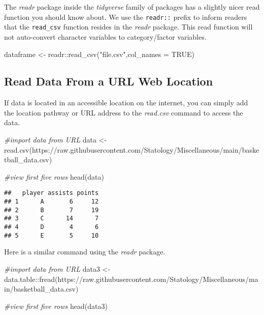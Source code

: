 \documentclass[
]{book}
\newenvironment{Shaded}{\begin{snugshade}}{\end{snugshade}}
\newcommand{\AttributeTok}[1]{\textcolor[rgb]{0.77,0.63,0.00}{#1}}
\newcommand{\CommentTok}[1]{\textcolor[rgb]{0.56,0.35,0.01}{\textit{#1}}}
\newcommand{\ConstantTok}[1]{\textcolor[rgb]{0.00,0.00,0.00}{#1}}
\newcommand{\FunctionTok}[1]{\textcolor[rgb]{0.00,0.00,0.00}{#1}}
\newcommand{\NormalTok}[1]{#1}
\newcommand{\OtherTok}[1]{\textcolor[rgb]{0.56,0.35,0.01}{#1}}
\newcommand{\SpecialCharTok}[1]{\textcolor[rgb]{0.00,0.00,0.00}{#1}}
\newcommand{\StringTok}[1]{\textcolor[rgb]{0.31,0.60,0.02}{#1}}
\begin{document}
The \emph{readr} package inside the \emph{tidyverse} family of packages has a slightly nicer read function you should know about. We use the \texttt{readr::} prefix to inform readers that the \texttt{read\_csv} function resides in the \emph{readr} package. This read function will not auto-convert character variables to category/factor variables.

\begin{Shaded}
\begin{Highlighting}[]
\NormalTok{dataframe }\OtherTok{\textless{}{-}}\NormalTok{ readr}\SpecialCharTok{::}\FunctionTok{read\_csv}\NormalTok{(}\StringTok{"file.csv"}\NormalTok{,}\AttributeTok{col\_names =} \ConstantTok{TRUE}\NormalTok{)}
\end{Highlighting}
\end{Shaded}

\hypertarget{read-data-from-a-url-web-location}{%
\subsection{Read Data From a URL Web Location}\label{read-data-from-a-url-web-location}}

If data is located in an accessible location on the internet, you can simply add the location pathway or URL address to the \emph{read.csv} command to access the data.

\begin{Shaded}
\begin{Highlighting}[]
\CommentTok{\#import data from URL}
\NormalTok{data }\OtherTok{\textless{}{-}} \FunctionTok{read.csv}\NormalTok{(}\StringTok{\textquotesingle{}https://raw.githubusercontent.com/Statology/Miscellaneous/main/basketball\_data.csv\textquotesingle{}}\NormalTok{)}

\CommentTok{\#view first five rows}
\FunctionTok{head}\NormalTok{(data)}
\end{Highlighting}
\end{Shaded}

\begin{verbatim}
##   player assists points
## 1      A       6     12
## 2      B       7     19
## 3      C      14      7
## 4      D       4      6
## 5      E       5     10
\end{verbatim}

Here is a similar command using the \emph{readr} package.

\begin{Shaded}
\begin{Highlighting}[]
\CommentTok{\#import data from URL}
\NormalTok{data3 }\OtherTok{\textless{}{-}}\NormalTok{ data.table}\SpecialCharTok{::}\FunctionTok{fread}\NormalTok{(}\StringTok{\textquotesingle{}https://raw.githubusercontent.com/Statology/Miscellaneous/main/basketball\_data.csv\textquotesingle{}}\NormalTok{)}

\CommentTok{\#view first five rows}
\FunctionTok{head}\NormalTok{(data3)}
\end{Highlighting}
\end{Shaded}
\end{document}
